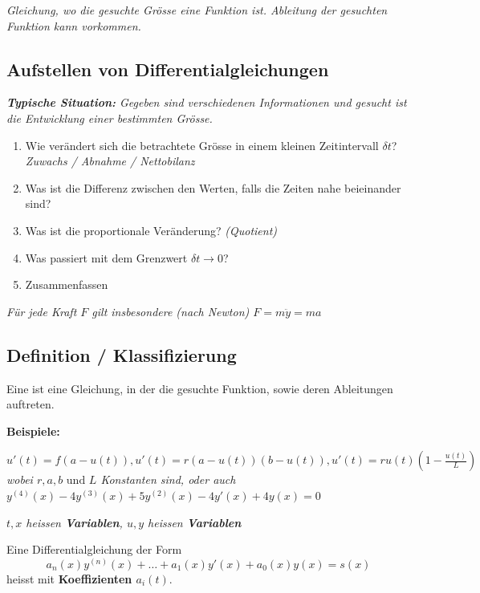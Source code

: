 \textit{Gleichung, wo die gesuchte Grösse eine Funktion ist. Ableitung der gesuchten Funktion kann vorkommen.}

\subsection{Aufstellen von Differentialgleichungen}

\textit{\textbf{Typische Situation:} Gegeben sind verschiedenen Informationen und gesucht ist die
Entwicklung einer bestimmten Grösse.}

\begin{enumerate}
    \item Wie verändert sich die betrachtete Grösse in einem kleinen Zeitintervall $\delta t$?\\
        \textit{Zuwachs / Abnahme / Nettobilanz}
    \item Was ist die Differenz zwischen den Werten, falls die Zeiten nahe beieinander sind?
    \item Was ist die proportionale Veränderung? \textit{(Quotient)}
    \item Was passiert mit dem Grenzwert $\delta t \rightarrow 0$?
    \item Zusammenfassen 
\end{enumerate}

\textit{
    Für jede Kraft $F$ gilt insbesondere (nach Newton) $F = m\ddot{y} = ma$
}

\subsection{Definition / Klassifizierung}

Eine  ist eine Gleichung, in der die gesuchte Funktion, sowie deren Ableitungen auftreten.

\begin{exercise}
    \textbf{Beispiele:} 

    \textit{$u'(t)=f(a-u(t)), u'(t)=r(a-u(t))(b-u(t)), u'(t)=ru(t)(1-\frac{u(t)}{L})$ wobei $r,a,b \text{ und }L$ Konstanten sind, oder auch $y^{(4)}(x)-4y^{(3)}(x)+5y^{(2)}(x)-4y'(x)+4y(x)=0$}    

    \textit{
    $t,x$ heissen \textbf{ Variablen},
    $u,y$ heissen \textbf{ Variablen}
    }
\end{exercise}

Eine Differentialgleichung der Form 
$$a_n(x)y^{(n)}(x)+\dots+a_1(x)y'(x)+a_0(x)y(x)=s(x)$$ 
heisst  mit \textbf{Koeffizienten $a_i(t)$}.

